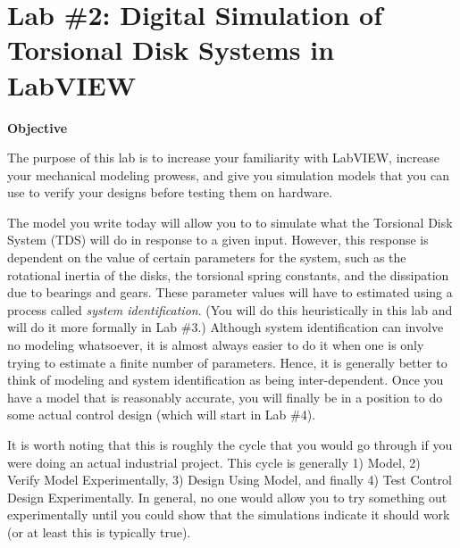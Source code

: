 \pagestyle{fancy}
\fancyhf{}
\fancyfoot[C]{\vspace{.2in}\thepage}


\chapter{Lab \#2:  Digital Simulation of Torsional Disk Systems in
  LabVIEW}
\date{}
\maketitle
\thispagestyle{fancy}

\begin{center}  \textbf{Objective}
\end{center}

The purpose of this lab is to increase your familiarity with LabVIEW, increase
your mechanical modeling prowess, and give you simulation models that you can
use to verify your designs before testing them on hardware.  

The model you write today will allow you to to simulate what the Torsional Disk
System (TDS) will do in response to a given input.  However, this response is
dependent on the value of certain parameters for the system, such as the
rotational inertia of the disks, the torsional spring constants, and the
dissipation due to bearings and gears.  These parameter values will have to
estimated using a process called \emph{system identification}.  (You will do
this heuristically in this lab and will do it more formally in Lab \#3.)
Although system identification can involve no modeling whatsoever, it is almost
always easier to do it when one is only trying to estimate a finite number of
parameters.  Hence, it is generally better to think of modeling and system
identification as being inter-dependent.  Once you have a model that is
reasonably accurate, you will finally be in a position to do some actual control
design (which will start in Lab \#4).

It is worth noting that this is roughly the cycle that you would go through if
you were doing an actual industrial project.  This cycle is generally 1) Model,
2) Verify Model Experimentally, 3) Design Using Model, and finally 4) Test
Control Design Experimentally.  In general, no one would allow you to try
something out experimentally until you could show that the simulations indicate
it should work (or at least this is typically true).

